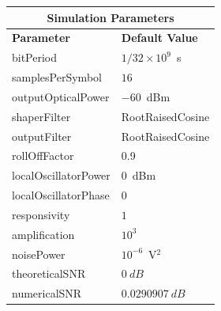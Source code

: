 \begin{refsection}
\begin{table}[H]
	\begin{tabular}{|l|l|}
		\hline
		\multicolumn{2}{|c|}{ \textbf{Simulation Parameters} } \\
		\hline
		\textbf{Parameter}     & \textbf{Default Value}                                     \\\hline
		bitPeriod              & $1/32\times10^9$~s														\\\hline
		samplesPerSymbol       & $16$                                                       \\\hline
		outputOpticalPower     & $-60$~dBm 													\\ \hline
		shaperFilter	       & RootRaisedCosine												\\ \hline
		outputFilter		   & RootRaisedCosine												\\ \hline
		rollOffFactor		   & 0.9														\\ \hline
		localOscillatorPower   & $0$~dBm                                                    \\ \hline
		localOscillatorPhase   & $0$                                                        \\ \hline
		responsivity           & $1$                                                        \\ \hline
		amplification          & $10^3$                                                     \\ \hline
		noisePower   & $10^{-6}$~V$^2$                             					\\ \hline
				theoreticalSNR  	   & $0~dB$                             					\\ \hline
		numericalSNR 		     & $0.0290907~dB$                             					\\ \hline

\end{tabular}
\end{table}
\end{refsection}

